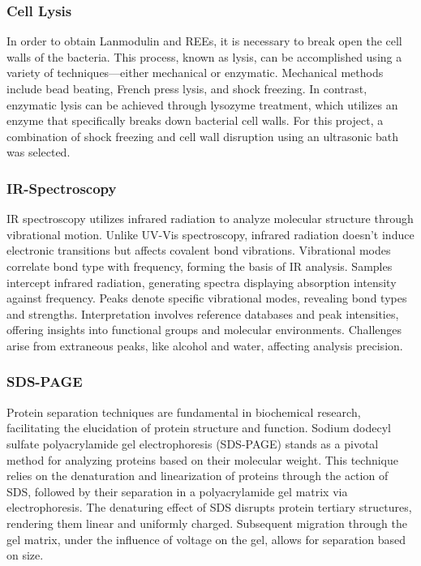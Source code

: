 \subsubsection{Cell Lysis\authorB{}}
In order to obtain Lanmodulin and REEs, it is necessary to break open the cell walls of the
bacteria.
This process, known as lysis, can be accomplished using a variety of techniques—either mechanical or enzymatic.
Mechanical methods include bead beating, French press lysis, and shock freezing.
In contrast, enzymatic lysis can be achieved through lysozyme treatment, which utilizes an enzyme that specifically breaks down bacterial cell walls.
For this project, a combination of shock freezing and cell wall disruption using an ultrasonic bath was selected.

\subsubsection{IR-Spectroscopy\authorB}
IR spectroscopy utilizes infrared radiation to analyze molecular structure through vibrational motion.
Unlike UV-Vis spectroscopy, infrared radiation doesn't induce electronic transitions but
affects covalent bond vibrations.
Vibrational modes correlate bond type with frequency, forming the basis of IR analysis.
Samples intercept infrared radiation, generating spectra displaying absorption intensity against frequency.
Peaks denote specific vibrational modes, revealing bond types and strengths.
Interpretation involves reference databases and peak intensities, offering insights into functional groups and molecular environments.
Challenges arise from extraneous peaks, like alcohol and water, affecting analysis precision.

\subsubsection{SDS-PAGE\authorB{}}
Protein separation techniques are fundamental in biochemical research, facilitating the
elucidation of protein structure and function.
Sodium dodecyl sulfate polyacrylamide gel electrophoresis (SDS-PAGE) stands as a pivotal method for analyzing proteins based on their molecular weight.
This technique relies on the denaturation and linearization of proteins through the action of SDS, followed by their separation in a polyacrylamide gel matrix via electrophoresis.
The denaturing effect of SDS disrupts protein tertiary structures, rendering them linear and uniformly charged.
Subsequent migration through the gel matrix, under the influence of voltage on the gel, allows for separation based on size.

\newpage